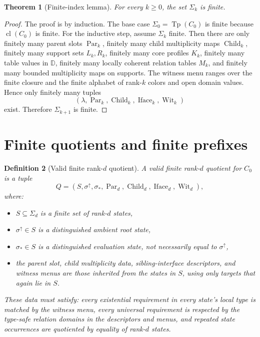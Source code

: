 \documentclass[11pt]{article}
\newtheorem{definition}{Definition}[section]
\newtheorem{theorem}[definition]{Theorem}
\theoremstyle{remark}
\newcommand{\cl}{\operatorname{cl}}
\newcommand{\Tp}{\operatorname{Tp}}
\newcommand{\Child}{\operatorname{Child}}
\newcommand{\Iface}{\operatorname{Iface}}
\newcommand{\Wit}{\operatorname{Wit}}
\newcommand{\Par}{\operatorname{Par}}
\newcommand{\OpenDom}{\mathbb{D}}
\begin{document}
\begin{theorem}[Finite-index lemma]\label{thm:finite-index-completed}
For every $k\ge 0$, the set $\Sigma_k$ is finite.
\end{theorem}

\begin{proof}
The proof is by induction. The base case $\Sigma_0=\Tp(C_0)$ is finite because $\cl(C_0)$ is finite. For the inductive step, assume $\Sigma_k$ finite. Then there are only finitely many parent slots $\Par_k$, finitely many child multiplicity maps $\Child_k$, finitely many support sets $L_k,R_k$, finitely many core profiles $K_k$, finitely many table values in $\OpenDom$, finitely many locally coherent relation tables $M_k$, and finitely many bounded multiplicity maps on supports. The witness menu ranges over the finite closure and the finite alphabet of rank-$k$ colors and open domain values. Hence only finitely many tuples
\[
(\lambda,\Par_k,\Child_k,\Iface_k,\Wit_k)
\]
exist. Therefore $\Sigma_{k+1}$ is finite.
\end{proof}

\section{Finite quotients and finite prefixes}

\begin{definition}[Valid finite rank-$d$ quotient]\label{def:valid-quotient}
A \emph{valid finite rank-$d$ quotient} for $C_0$ is a tuple
\[
Q=(S,\sigma^{\uparrow},\sigma_{\ast},\Par_d,\Child_d,\Iface_d,\Wit_d),
\]
where:
\begin{itemize}
    \item $S\subseteq \Sigma_d$ is a finite set of rank-$d$ states,
    \item $\sigma^{\uparrow}\in S$ is a distinguished \emph{ambient root state},
    \item $\sigma_{\ast}\in S$ is a distinguished \emph{evaluation state}, not necessarily equal to $\sigma^{\uparrow}$,
    \item the parent slot, child multiplicity data, sibling-interface descriptors, and witness menus are those inherited from the states in $S$, using only targets that again lie in $S$.
\end{itemize}
These data must satisfy: every existential requirement in every state's local type is matched by the witness menu, every universal requirement is respected by the type-safe relation domains in the descriptors and menus, and repeated state occurrences are quotiented by equality of rank-$d$ states.
\end{definition}
\end{document}
